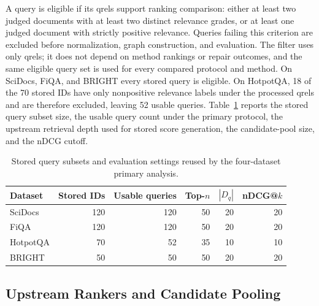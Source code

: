 \documentclass[manuscript,anonymous,review]{acmart}
\begin{document}
A query is eligible if its qrels support ranking comparison: either at least
two judged documents with at least two distinct relevance grades, or at least
one judged document with strictly positive relevance. Queries failing this
criterion are excluded before normalization, graph construction, and
evaluation. The filter uses only qrels; it does not depend on method rankings
or repair outcomes, and the same eligible query set is used for every compared
protocol and method. On SciDocs, FiQA, and BRIGHT every stored query is
eligible. On HotpotQA, 18 of the 70 stored IDs have only nonpositive relevance
labels under the processed qrels and are therefore excluded, leaving 52 usable
queries. Table~\ref{tab:dataset-stats} reports the stored query subset size,
the usable query count under the primary protocol, the upstream retrieval depth
used for stored score generation, the candidate-pool size, and the nDCG
cutoff.

\begin{table}[t]
  \caption{Stored query subsets and evaluation settings reused by the
    four-dataset primary analysis.}
  \label{tab:dataset-stats}
  \begin{tabular}{lrrrrr}
    \toprule
    Dataset & Stored IDs & Usable queries & Top-$n$ & $|D_q|$ & nDCG@$k$ \\
    \midrule
    SciDocs  & 120 & 120 & 50 & 20 & 20 \\
    FiQA     & 120 & 120 & 50 & 20 & 20 \\
    HotpotQA & 70  & 52  & 35 & 10 & 10 \\
    BRIGHT   & 50  & 50  & 50 & 20 & 20 \\
    \bottomrule
  \end{tabular}
\end{table}

\subsection{Upstream Rankers and Candidate Pooling}
\label{sec:rankers}
\end{document}
